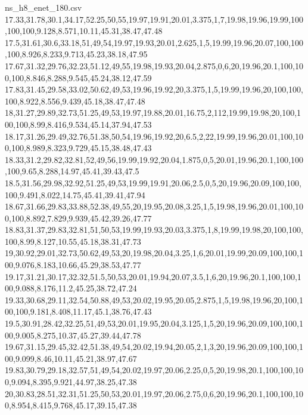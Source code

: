 \begin{filecontents*}[overwrite]{ns_h8_enet_180.csv}
17.33,31.78,30.1,34.17,52.25,50,55,19.97,19.91,20.01,3.375,1,7,19.98,19.96,19.99,100,100,100,9.128,8.571,10.11,45.31,38.47,47.48
17.5,31.61,30.6,33.18,51,49,54,19.97,19.93,20.01,2.625,1,5,19.99,19.96,20.07,100,100,100,8.926,8.233,9.713,45.23,38.18,47.95
17.67,31.32,29.76,32.23,51.12,49,55,19.98,19.93,20.04,2.875,0,6,20,19.96,20.1,100,100,100,8.846,8.288,9.545,45.24,38.12,47.59
17.83,31.45,29.58,33.02,50.62,49,53,19.96,19.92,20,3.375,1,5,19.99,19.96,20,100,100,100,8.922,8.556,9.439,45.18,38.47,47.48
18,31.27,29.89,32.73,51.25,49,53,19.97,19.88,20.01,16.75,2,112,19.99,19.98,20,100,100,100,8.99,8.416,9.534,45.14,37.94,47.53
18.17,31.26,29.49,32.76,51.38,50,54,19.96,19.92,20,6.5,2,22,19.99,19.96,20.01,100,100,100,8.989,8.323,9.729,45.15,38.48,47.43
18.33,31.2,29.82,32.81,52,49,56,19.99,19.92,20.04,1.875,0,5,20.01,19.96,20.1,100,100,100,9.65,8.288,14.97,45.41,39.43,47.5
18.5,31.56,29.98,32.92,51.25,49,53,19.99,19.91,20.06,2.5,0,5,20,19.96,20.09,100,100,100,9.491,8.022,14.75,45.41,39.41,47.94
18.67,31.66,29.83,33.88,52.38,49,55,20,19.95,20.08,3.25,1,5,19.98,19.96,20.01,100,100,100,8.892,7.829,9.939,45.42,39.26,47.77
18.83,31.37,29.83,32.81,51,50,53,19.99,19.93,20.03,3.375,1,8,19.99,19.98,20,100,100,100,8.99,8.127,10.55,45.18,38.31,47.73
19,30.92,29.01,32.73,50.62,49,53,20,19.98,20.04,3.25,1,6,20.01,19.99,20.09,100,100,100,9.076,8.183,10.66,45.29,38.53,47.77
19.17,31.21,30.17,32.32,51.5,50,53,20.01,19.94,20.07,3.5,1,6,20,19.96,20.1,100,100,100,9.088,8.176,11.2,45.25,38.72,47.24
19.33,30.68,29.11,32.54,50.88,49,53,20.02,19.95,20.05,2.875,1,5,19.98,19.96,20,100,100,100,9.181,8.408,11.17,45.1,38.76,47.43
19.5,30.91,28.42,32.25,51,49,53,20.01,19.95,20.04,3.125,1,5,20,19.96,20.09,100,100,100,9.005,8.275,10.37,45.27,39.44,47.78
19.67,31.15,29.45,32.42,51.38,49,54,20.02,19.94,20.05,2,1,3,20,19.96,20.09,100,100,100,9.099,8.46,10.11,45.21,38.97,47.67
19.83,30.79,29.18,32.57,51,49,54,20.02,19.97,20.06,2.25,0,5,20,19.98,20.1,100,100,100,9.094,8.395,9.921,44.97,38.25,47.38
20,30.83,28.51,32.31,51.25,50,53,20.01,19.97,20.06,2.75,0,6,20,19.96,20.1,100,100,100,8.954,8.415,9.768,45.17,39.15,47.38
\end{filecontents*}


